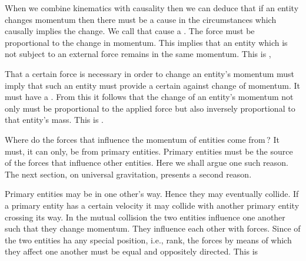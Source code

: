 
\begynd
\pind When we combine kinematics with causality
\begynd
\pind then we can deduce that if an entity changes momentum \nyl
      then there must be a cause in the circumstances \nyl which
      causally implies the change.
\pind We call that cause a . %
\pind The force must be proportional to the change in momentum.
\pind This implies that an entity which is not subject to an external
      force \nyl remains in the same momentum.
\pind This is , 
\afslut
\afslut


\begynd
\pind That a certain force is necessary \nyl in order to change an entity's  
      momentum \nyl must imply that such an entity must provide a
      certain   against
      change of momentum.
\begynd
\pind It must have a . %
\pind From this it follows that the change of an entity's momentum
\begynd
\pind not only must be proportional to the applied force
\pind but also inversely proportional to that entity's mass.
\afslut
\pind This is . 
\afslut
\afslut


\begynd
\pind Where do the forces that influence the momentum of entities come from\,?
\pind It must, it can only, be from primary entities.
\begynd
\pind Primary entities must be the source of the forces that influence
      other entities.
\pind Here we shall argue one such reason.
\pind The next section, on universal gravitation, presents a second reason.
\afslut

\mnewfoil

\pind Primary entities may be in one other's way.
\begynd
\pind Hence they may eventually collide.
\pind If a primary entity has a certain velocity \nyl
      it may collide with another primary entity crossing its way.
\pind In the mutual collision the two entities influence one another
      \nyl such that they change momentum.
\pind They influence each other with forces.
\pind Since  of the two entities ha any special position, i.e.,
      rank, \nyl
\begynd
\pind the forces by means of which they affect one another
\pind must be equal and oppositely directed.
\afslut
\afslut
\pind This is  %
\afslut
 

